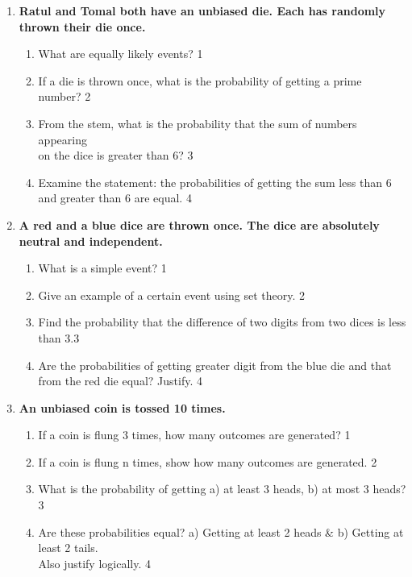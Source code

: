 \documentclass[a4paper,oneside]{book}
\begin{document}
\begin{enumerate}
  
       \item
	  \textbf{Ratul and Tomal both have an unbiased die. Each has randomly thrown their die once.} 
  
  \begin{enumerate}
    \item
	What are equally likely events? \hfill 1
    \item
	If a die is thrown once, what is the probability of getting a prime 
	number? \hfill 2
    \item  
	From the stem, what is the probability that the sum of numbers appearing
	\\ on the dice is greater than 6? \hfill 3
    \item
	Examine the statement: the probabilities of getting the sum less than 6 and greater 
	than 6 are equal. \hfill 4
  \end{enumerate}

 \item
	  \textbf{A red and a blue dice are thrown once. The dice are absolutely neutral and independent.} 
  
  \begin{enumerate}
    \item
	What is a simple event? \hfill 1
    \item
	Give an example of a certain event using set theory. \hfill 2
    \item  
	Find the probability that the difference of two digits from two dices is less than 3.\hfill 3
    \item
	Are the probabilities of getting greater digit from the blue die and that from the red die equal? Justify. \hfill 4
  \end{enumerate}
  
  \item
	  \textbf{An unbiased coin is tossed 10 times.} 
  
  \begin{enumerate}
    \item
	If a coin is flung 3 times, how many outcomes are generated? \hfill 1
    \item
	If a coin is flung n times, show how many outcomes are generated. \hfill 2
    \item  
	What is the probability of getting a) at least 3 heads, b) at most 3 heads? \hfill 3
    \item
	Are these probabilities equal? a) Getting at least 2 heads \& b) Getting at least 2 tails. \\ Also justify logically. \hfill 4
  \end{enumerate}
  

\end{enumerate}
\end{document}
